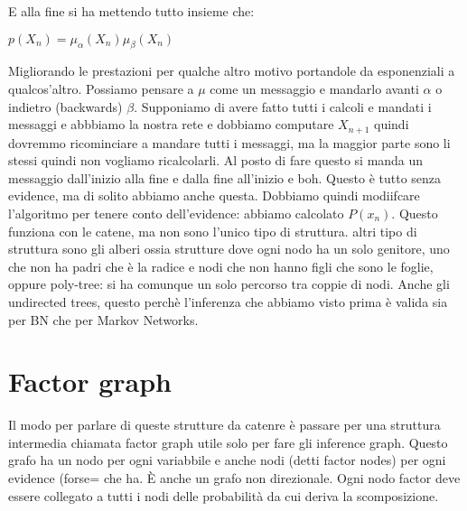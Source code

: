 E alla fine si ha mettendo tutto insieme che:
\begin{center}
	$\displaystyle p(X_n)=\mu_\alpha(X_n)\mu_\beta(X_n)$
\end{center}
Migliorando le prestazioni per qualche altro motivo portandole da esponenziali a qualcos'altro.\newline 
Possiamo pensare a $\mu$ come un messaggio e mandarlo avanti $\alpha$ o indietro (backwards) $\beta$.\newline
Supponiamo di avere fatto tutti i calcoli e mandati i messaggi e abbbiamo la nostra rete e dobbiamo computare $X_{n+1}$ quindi dovremmo ricominciare a mandare tutti i messaggi, ma la maggior parte sono li stessi quindi non vogliamo ricalcolarli. Al posto di fare questo si manda un messaggio dall'inizio alla fine e dalla fine all'inizio e boh. \newline
Questo è tutto senza evidence, ma di solito abbiamo anche questa. Dobbiamo quindi modiifcare l'algoritmo per tenere conto dell'evidence: abbiamo calcolato $P(x_n)$.\newline
Questo funziona con le catene, ma non sono l'unico tipo di struttura. altri tipo di struttura sono gli alberi ossia strutture dove ogni nodo ha un solo genitore, uno che non ha padri che è la radice e nodi che non hanno figli che sono le foglie, oppure poly-tree: si ha comunque un solo percorso tra coppie di nodi. Anche gli undirected trees, questo perchè l'inferenza che abbiamo visto prima è valida sia per BN che per Markov Networks. 
\section{Factor graph}
Il modo per parlare di queste strutture da catenre è passare per una struttura intermedia chiamata factor graph utile solo per fare gli inference graph. \newline
Questo grafo ha un nodo per ogni variabbile e anche nodi (detti factor nodes) per ogni evidence (forse= che ha. È anche un grafo non direzionale. \newline
Ogni nodo factor deve essere collegato a tutti i nodi delle probabilità da cui deriva la scomposizione. 
